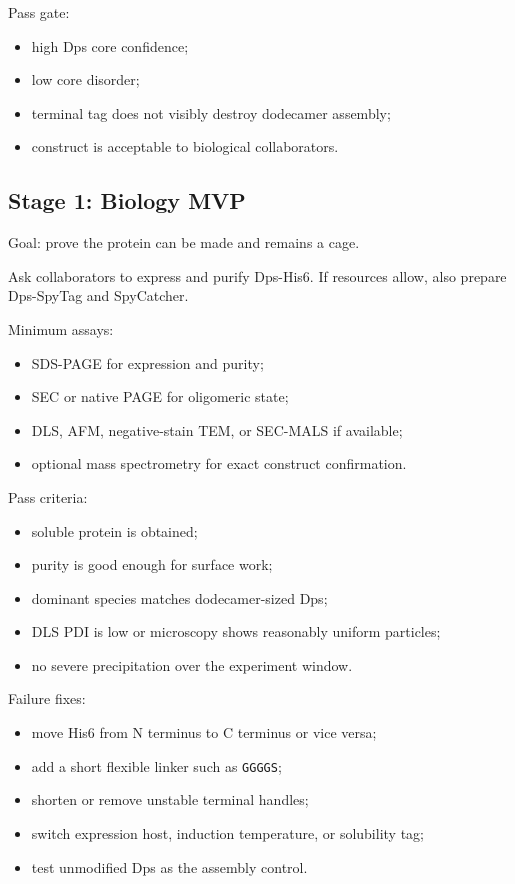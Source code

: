 \documentclass[11pt]{article}
\begin{document}
Pass gate:

\begin{itemize}
\item high Dps core confidence;
\item low core disorder;
\item terminal tag does not visibly destroy dodecamer assembly;
\item construct is acceptable to biological collaborators.
\end{itemize}

\subsection{Stage 1: Biology MVP}

Goal: prove the protein can be made and remains a cage.

Ask collaborators to express and purify Dps-His6. If resources allow, also prepare Dps-SpyTag and SpyCatcher.

Minimum assays:

\begin{itemize}
\item SDS-PAGE for expression and purity;
\item SEC or native PAGE for oligomeric state;
\item DLS, AFM, negative-stain TEM, or SEC-MALS if available;
\item optional mass spectrometry for exact construct confirmation.
\end{itemize}

Pass criteria:

\begin{itemize}
\item soluble protein is obtained;
\item purity is good enough for surface work;
\item dominant species matches dodecamer-sized Dps;
\item DLS PDI is low or microscopy shows reasonably uniform particles;
\item no severe precipitation over the experiment window.
\end{itemize}

Failure fixes:

\begin{itemize}
\item move His6 from N terminus to C terminus or vice versa;
\item add a short flexible linker such as \texttt{GGGGS};
\item shorten or remove unstable terminal handles;
\item switch expression host, induction temperature, or solubility tag;
\item test unmodified Dps as the assembly control.
\end{itemize}
\end{document}
